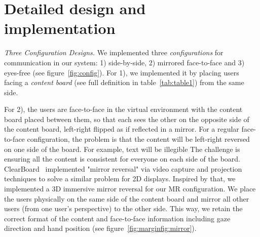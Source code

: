 \documentclass[sigchi-a]{acmart}
\begin{document}
\section{Detailed design and implementation}

\textit{Three Configuration Designs.}
We implemented three \textit{configurations} for communication in our system: 1) side-by-side, 2) mirrored face-to-face and 3) eyes-free (see figure~\ref{fig:config}). 
For 1), we implemented it by placing users facing a \textit{content board} (see full definition in table~\ref{tab:table1}) from the same side.

For 2), the users are face-to-face in the virtual environment with the content board placed between them, so that each sees the other on the opposite side of the content board, left-right flipped as if reflected in a mirror.
For a regular face-to-face configuration, the problem is that the content will be left-right reversed on one side of the board. For example, text will be illegible
The challenge is ensuring all the content is consistent
for everyone on each side of the board. ClearBoard~\cite{ishii1993integration} implemented "mirror reversal" via video capture and projection techniques to solve a similar problem for 2D displays. Inspired by that, we implemented a 3D immersive mirror reversal for our MR configuration. We place the users physically
on the same side of the content board and mirror all other users (from one user's perspective) to the other side. This way, we retain the correct format of the content and face-to-face information including gaze direction and hand position (see figure~\ref{fig:marginfig:mirror}).

\end{document}
